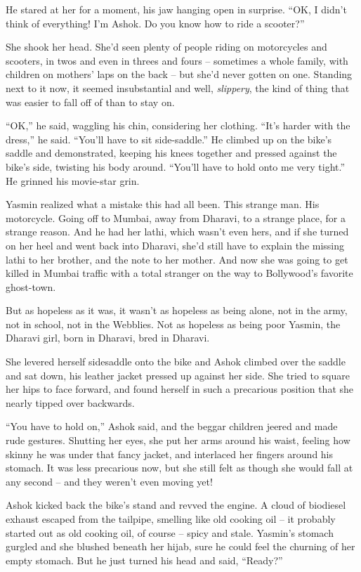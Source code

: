 He stared at her for a moment, his jaw hanging open in surprise.
``OK, I didn't think of everything! I'm Ashok. Do you know how to
ride a scooter?''

She shook her head. She'd seen plenty of people riding on
motorcycles and scooters, in twos and even in threes and fours --
sometimes a whole family, with children on mothers' laps on the
back -- but she'd never gotten on one. Standing next to it now, it
seemed insubstantial and well, \emph{slippery}, the kind of thing
that was easier to fall off of than to stay on.

``OK,'' he said, waggling his chin, considering her clothing. ``It's
harder with the dress,'' he said. ``You'll have to sit side-saddle.''
He climbed up on the bike's saddle and demonstrated, keeping his
knees together and pressed against the bike's side, twisting his
body around. ``You'll have to hold onto me very tight.'' He grinned
his movie-star grin.

Yasmin realized what a mistake this had all been. This strange man.
His motorcycle. Going off to Mumbai, away from Dharavi, to a
strange place, for a strange reason. And he had her lathi, which
wasn't even hers, and if she turned on her heel and went back into
Dharavi, she'd still have to explain the missing lathi to her
brother, and the note to her mother. And now she was going to get
killed in Mumbai traffic with a total stranger on the way to
Bollywood's favorite ghost-town.

But as hopeless as it was, it wasn't as hopeless as being alone,
not in the army, not in school, not in the Webblies. Not as
hopeless as being poor Yasmin, the Dharavi girl, born in Dharavi,
bred in Dharavi.

She levered herself sidesaddle onto the bike and Ashok climbed over
the saddle and sat down, his leather jacket pressed up against her
side. She tried to square her hips to face forward, and found
herself in such a precarious position that she nearly tipped over
backwards.

``You have to hold on,'' Ashok said, and the beggar children jeered
and made rude gestures. Shutting her eyes, she put her arms around
his waist, feeling how skinny he was under that fancy jacket, and
interlaced her fingers around his stomach. It was less precarious
now, but she still felt as though she would fall at any second --
and they weren't even moving yet!

Ashok kicked back the bike's stand and revved the engine. A cloud
of biodiesel exhaust escaped from the tailpipe, smelling like old
cooking oil -- it probably started out as old cooking oil, of
course -- spicy and stale. Yasmin's stomach gurgled and she blushed
beneath her hijab, sure he could feel the churning of her empty
stomach. But he just turned his head and said, ``Ready?''

